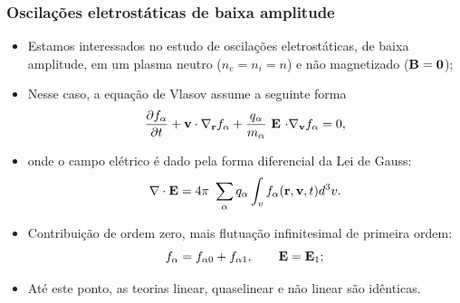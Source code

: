 \documentclass[10pt,aspectratio=1610,lualatex]{beamer}
\begin{document}
\begin{frame}\frametitle{Oscilações eletrostáticas de baixa
    amplitude} \label{common}
  \begin{itemize}
    \item Estamos interessados no estudo de oscilações eletrostáticas,
    de baixa amplitude, em um plasma neutro ($n_e=n_i=n$) e não
    magnetizado (${\bf B=0}$);
    \vspace{0.2cm}
    \pause
    \item Nesse caso, a equação de Vlasov assume a seguinte forma
    \begin{equation*}
      \frac{\partial f_\alpha}{\partial t}+{\bf v \cdot \nabla_r}f_\alpha
      +\frac{q_\alpha}{m_\alpha}\ {\bf E}\ {\bf\cdot \nabla_v}f_\alpha=0,
    \end{equation*}
    \item onde o campo elétrico é dado pela forma diferencial da Lei
    de Gauss:
    \begin{equation*}
      {\bf \nabla \cdot E}  = 4\pi\ \sum_\alpha q_\alpha
      \int_v  f_\alpha({\bf r},{\bf v},t) d^3v.
    \end{equation*}
    \item Contribuição de ordem zero, mais flutuação infinitesimal de
    primeira ordem:
    \begin{equation*}
      f_{\alpha}=f_{\alpha0}+f_{\alpha1},\qquad
      {\bf E}={\bf E}_1;
    \end{equation*}\vspace{-0.6cm}
    \pause
    \item Até este ponto, as teorias linear, quaselinear e não linear
    são idênticas.
  \end{itemize}
\end{frame}
\end{document}
